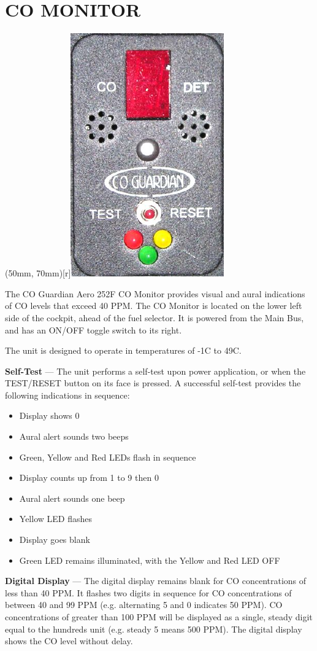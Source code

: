 \section{CO MONITOR}
\parpic(50mm, 70mm)[r]{\includegraphics{../Diagrams/co}}


The CO Guardian Aero 252F CO Monitor provides visual and aural indications of CO levels that exceed 40 PPM. The CO Monitor is located on the lower left side of the cockpit, ahead of the fuel selector. It is powered from the Main Bus, and has an ON/OFF toggle switch to its right.

The unit is designed to operate in temperatures of -1\textdegree C to 49\textdegree C.

\textbf{Self-Test} --- The unit performs a self-test upon power application, or when the TEST/RESET button on its face is pressed. A successful self-test provides the following indications in sequence:
\begin{itemize}
\item Display shows 0
\item Aural alert sounds two beeps
\item Green, Yellow and Red LEDs flash in sequence
\item Display counts up from 1 to 9 then 0
\item Aural alert sounds one beep
\item Yellow LED flashes
\item Display goes blank
\item Green LED remains illuminated, with the Yellow and Red LED OFF
\end{itemize}
\textbf{Digital Display} --- The digital display remains blank for CO concentrations of less than 40 PPM. It flashes two digits in sequence for CO concentrations of between 40 and 99 PPM (e.g. alternating 5 and 0 indicates 50 PPM). CO concentrations of greater than 100 PPM will be displayed as a single, steady digit equal to the hundreds unit (e.g. steady 5 means 500 PPM). The digital display shows the CO level without delay.

